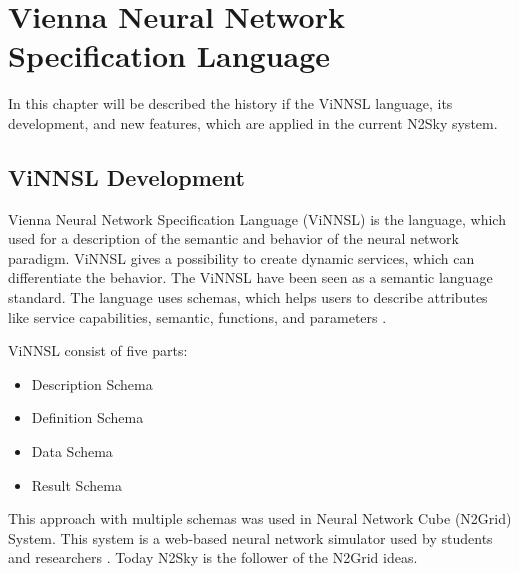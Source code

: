 \section{Vienna Neural Network Specification Language}\label{ViNNSL 2.0 extended}

In this chapter will be described the history if the ViNNSL language, its development, and new features, which are applied in the current N2Sky system.

\subsection{ViNNSL Development}\label{ViNNSL Development}
Vienna Neural Network Specification Language (ViNNSL) is the language, which used for a description of the semantic and behavior of the neural network paradigm. ViNNSL gives a possibility to create dynamic services, which can differentiate the behavior. The ViNNSL have been seen as a semantic language standard. The language uses schemas, which helps users to describe attributes like service capabilities, semantic, functions, and parameters \cite{Beran2008}.

ViNNSL consist of five parts:
\begin{itemize}
\item Description Schema
\item Definition Schema
\item Data Schema
\item Result Schema
\end{itemize}

This approach with multiple schemas was used in Neural Network Cube (N2Grid) System. This system is a web-based neural network simulator used by students and researchers \cite{schikuta2004n2grid}. Today N2Sky is the follower of the N2Grid ideas. 

